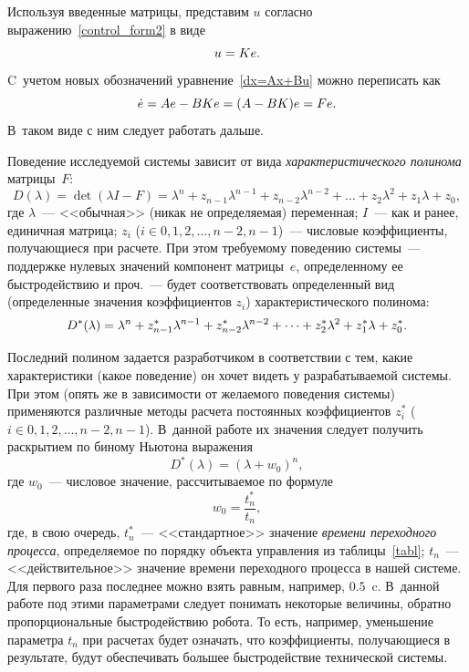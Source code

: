 \documentclass[12pt,a4paper,openany]{extarticle}
\begin{document}
Используя введенные матрицы, представим $u$ согласно выражению~\eqref{control_form2} в виде
\begin{equation}
	u = Ke\ldotp
\end{equation}
C~учетом новых обозначений уравнение~\eqref{dx=Ax+Bu} можно переписать как
\begin{equation}\label{model_on_e}
	\dot e = Ae-BKe = (A-BK)e = Fe\ldotp
\end{equation}
В~таком виде с ним следует работать дальше.

Поведение исследуемой системы зависит от вида \textit{характеристического полинома} матрицы~$F$:
\begin{equation}
	D(\lambda) = \det(\lambda I - F) = \lambda^n + z_{n-1}\lambda^{n-1} + z_{n-2}\lambda^{n-2} + \dots + z_{2}\lambda^{2} + z_{1}\lambda + z_0,
\end{equation}
где $\lambda$~--- <<обычная>> (никак не определяемая) переменная; $I$~--- как и ранее, единичная матрица; $z_i$ ($i\in{0,1,2,\dots,n-2, n-1}$)~--- числовые коэффициенты, получающиеся при расчете.
При этом требуемому поведению системы~--- поддержке нулевых значений компонент матрицы~$e$, определенному ее быстродействию и проч.~--- будет соответствовать определенный вид (определенные значения коэффициентов $z_i$) характеристического полинома:
\begin{equation}\label{poly_needed}
	D^*(\lambda) = \lambda^n + z^*_{n-1}\lambda^{n-1} + z^*_{n-2}\lambda^{n-2} + \dots + z^*_2\lambda^2 + z_1^*\lambda + z^*_0\ldotp
\end{equation}

Последний полином задается разработчиком в соответствии с тем, какие характеристики (какое поведение) он хочет видеть у разрабатываемой системы.
При этом (опять же в зависимости от желаемого поведения системы) применяются различные методы расчета постоянных коэффициентов $z^*_i$ ($i\in{0,1,2,\dots,n-2, n-1}$).
В~данной работе их значения следует получить раскрытием по биному Ньютона выражения
\begin{equation}\label{poly's}
	D^*(\lambda) = (\lambda+w_0)^n\!\!,
\end{equation}
где $w_0$~--- числовое значение, рассчитываемое по формуле
\begin{equation}
	w_0 = \frac{t^*_n}{t_n},
\end{equation}
где, в свою очередь,  $t_n^*$~--- <<стандартное>> значение \textit{времени переходного процесса}, определяемое по порядку объекта управления  из таблицы~\ref{tabl};  $t_n$~--- <<действительное>> значение времени переходного процесса в нашей системе.
Для первого раза последнее можно взять равным, например, $0.5$~c.
В~данной работе под этими параметрами следует понимать некоторые величины, обратно пропорциональные быстродействию робота.
То есть, например, уменьшение параметра $t_n$ при расчетах будет означать, что коэффициенты, получающиеся в результате, будут обеспечивать большее быстродействие технической системы.
\end{document}
